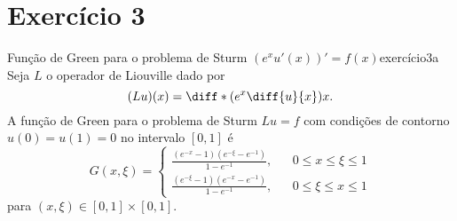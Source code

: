 \section*{Exercício 3}
\begin{proposition}{Função de Green para o problema de Sturm \((e^x u'(x))' = f(x)\)}{exercício3a}
    Seja \(L\) o operador de Liouville dado por
    \begin{equation*}
        (Lu)(x) = \diff*{\left(e^x \diff{u}{x}\right)}{x}.
    \end{equation*}
    A função de Green para o problema de Sturm \(Lu = f\) com condições de contorno \(u(0) = u(1) = 0\) no intervalo \([0,1]\) é
    \begin{equation*}
        G(x,\xi) = \left\{\begin{aligned}
                \frac{(e^{-x} - 1)(e^{-\xi} - e^{-1})}{1 - e^{-1}}, && 0 \leq x \leq \xi \leq 1\\
                \frac{(e^{-\xi} - 1)(e^{-x} - e^{-1})}{1 - e^{-1}}, && 0 \leq \xi \leq x \leq 1
        \end{aligned}\right.
    \end{equation*}
    para \((x, \xi) \in [0,1]\times [0,1]\).
\end{proposition}
